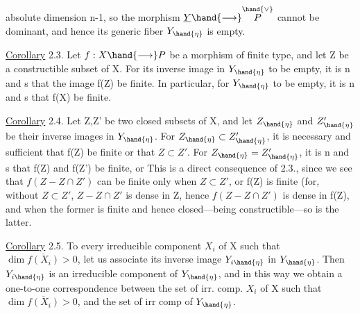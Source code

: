 
absolute dimension n-1, so the morphism $\underline{Y}\hand{\longrightarrow} \overset{\hand{\vee}}{P}$ cannot be dominant,
and hence its generic fiber $Y_{\hand{\eta}}$ is empty.

\uline{Corollary} 2.3. Let $f:X\hand{\longrightarrow} P$ be a morphism of finite type, and let Z be a
constructible subset of X. For its inverse image in $Y_{\hand{\eta}}$ to be empty,
it is n and s that the image f(Z) be finite. In particular, for  $Y_{\hand{\eta}}$ to be
empty, it is n and s that f(X) be finite.

\uline{Corollary} 2.4. Let Z,Z' be two closed  subsets of X,
and let $Z_{\hand{\eta}}$ and $Z'_{\hand{\eta}}$ be their inverse images in $Y_{\hand{\eta}}$. For
$Z_{\hand{\eta}}\subset Z'_{\hand{\eta}}$, it is necessary and sufficient that f(Z) be finite or that $Z\subset Z'$.
For $Z_{\hand{\eta}} = Z'_{\hand{\eta}}$, it is n and s that  f(Z) and f(Z') be finite, or 
 This is a 
 direct consequence of 2.3., since we see that $f(Z - Z\cap Z')$ can be finite
only when $Z\subset Z'$, or f(Z) is finite (for, without $Z\subset Z'$, $Z-Z\cap Z'$
is dense in Z, hence $f(Z-Z\cap Z')$ is dense in f(Z), and when the former
is finite and hence closed---being constructible---so is the latter.

\uline{Corollary} 2.5. To every irreducible component $X_i$ of X such that
$\dim \overline{f(X_i)} > 0$, let us associate  its inverse image $Y_{i\hand{\eta}}$ in
$Y_{\hand{\eta}}$. Then $Y_{i\hand{\eta}}$ is an irreducible component of $Y_{\hand{\eta}}$, and in this way we obtain
a one-to-one correspondence between the set of irr. comp.
$X_i$ of X such that $\dim \overline{f(X_i)}> 0$, and the set of irr comp of $Y_{\hand{\eta}}$.

